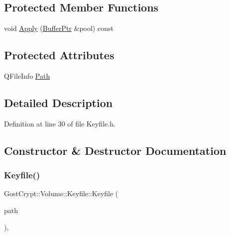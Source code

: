 \subsection*{Protected Member Functions}
\begin{DoxyCompactItemize}
\item 
void \hyperlink{class_gost_crypt_1_1_volume_1_1_keyfile_a6cb59e7b780543538a8c53f9b00d4434}{Apply} (\hyperlink{class_gost_crypt_1_1_buffer_ptr}{Buffer\+Ptr} \&pool) const
\end{DoxyCompactItemize}
\subsection*{Protected Attributes}
\begin{DoxyCompactItemize}
\item 
Q\+File\+Info \hyperlink{class_gost_crypt_1_1_volume_1_1_keyfile_a361fb705338bf371e4f151d24c2c4d84}{Path}
\end{DoxyCompactItemize}


\subsection{Detailed Description}


Definition at line 30 of file Keyfile.\+h.



\subsection{Constructor \& Destructor Documentation}
\mbox{\label{class_gost_crypt_1_1_volume_1_1_keyfile_ac06d59d9ea45d099d296732622bcb004}} 
\subsubsection{\texorpdfstring{Keyfile()}{Keyfile()}}
{\footnotesize\ttfamily Gost\+Crypt\+::\+Volume\+::\+Keyfile\+::\+Keyfile (\begin{DoxyParamCaption}\item[{const Q\+File\+Info \&}]{path }\end{DoxyParamCaption})\hspace{0.3cm}{\ttfamily [inline]}, {\ttfamily [explicit]}}



